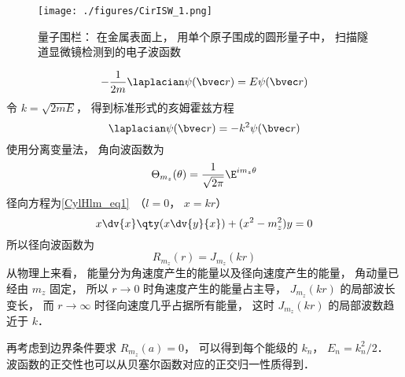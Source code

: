 
\begin{issues}
\issueDraft
\end{issues}


\begin{figure}[ht]
\centering
\texttt{[image: ./figures/CirISW\_1.png]}
\caption{量子围栏： 在金属表面上， 用单个原子围成的圆形量子中， 扫描隧道显微镜检测到的电子波函数} \label{CirISW_fig1}
\end{figure}

\begin{equation}
-\frac{1}{2m}\laplacian \psi(\bvec r) = E\psi(\bvec r)
\end{equation}
令 $k = \sqrt{2mE}$， 得到标准形式的亥姆霍兹方程
\begin{equation}
\laplacian \psi(\bvec r) = -k^2\psi(\bvec r)
\end{equation}
使用分离变量法， 角向波函数为
\begin{equation}
\Theta_{m_z}(\theta) = \frac{1}{\sqrt{2\pi}} \E^{im_z \theta}
\end{equation}
径向方程为\autoref{CylHlm_eq1}~（$l = 0$， $x = kr$）
\begin{equation}
x \dv{x} \qty(x\dv{y}{x}) + (x^2 - m_z^2)y = 0
\end{equation}
所以径向波函数为
\begin{equation}
R_{m_z}(r) = J_{m_z}(kr)
\end{equation}
从物理上来看， 能量分为角速度产生的能量以及径向速度产生的能量， 角动量已经由 $m_z$ 固定， 所以 $r \to 0$ 时角速度产生的能量占主导， $J_{m_z}(kr)$ 的局部波长变长， 而 $r\to \infty$ 时径向速度几乎占据所有能量， 这时 $J_{m_z}(kr)$ 的局部波数趋近于 $k$．

再考虑到边界条件要求 $R_{m_z}(a)  = 0$， 可以得到每个能级的 $k_n$， $E_n = k_n^2/2$． 波函数的正交性也可以从贝塞尔函数对应的正交归一性质得到．
